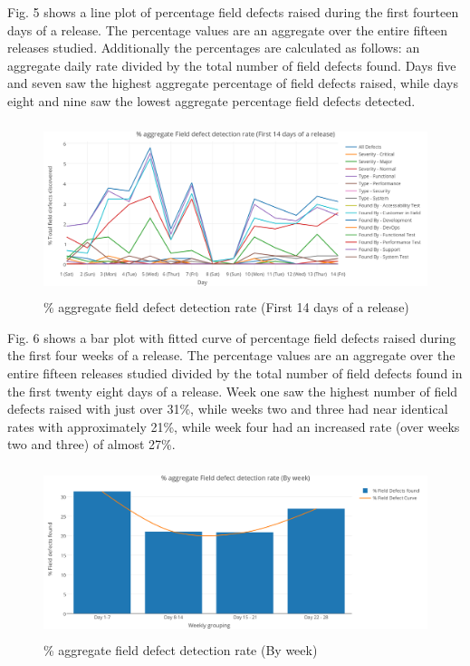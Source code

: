 Fig. 5 shows a line plot of percentage field defects raised during the first fourteen days of a release. The percentage values are an aggregate over the entire fifteen releases studied. Additionally the percentages are calculated as follows: an aggregate daily rate divided by the total number of field defects found. Days five and seven saw the highest aggregate percentage of field defects raised, while days eight and nine saw the lowest aggregate percentage
field defects detected.

\begin{figure}
\begin{center}
\includegraphics[height=5cm, width=14cm]{graphs/dogfood/Graph5.png} 
\caption{\% aggregate field defect detection rate (First 14 days of a release)}
\end{center}
\label{fig:fieldliketype}
\end{figure}


Fig. 6 shows a bar plot with fitted curve of percentage field defects raised during the first four weeks of a release. The percentage values are an aggregate over the entire fifteen releases studied divided by the total number of field defects found in the first twenty eight days of a release. Week one saw the highest number of field defects raised with just over 31\%, while weeks two and three had near identical rates with approximately 21\%, while week four had an increased rate (over weeks two and three) of almost 27\%.


\begin{figure}
\begin{center}
\includegraphics[height=5cm, width=12cm]{graphs/dogfood/Graph6.png} 
\caption{\% aggregate field defect detection rate (By week)}
\end{center}
\label{fig:fieldliketype}
\end{figure}

